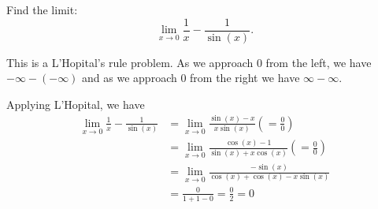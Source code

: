 \documentclass{ximera}
\author{Emma Smith Zbarsky}
\begin{document}
\begin{exercise}

Find the limit: \[\lim_{x \to 0} \frac{1}{x} - \frac{1}{\sin(x)}.\]


\begin{hint}
This is a L'Hopital's rule problem. As we approach 0 from the left, we
have $-\infty - (-\infty)$ and as we approach 0 from the right we have
$\infty-\infty$.
\end{hint}


\begin{hint}
Applying L'Hopital, we have \begin{align*}
\lim_{x\to 0} \frac{1}{x} - \frac{1}{\sin(x)} &= \lim_{x\to 0} \frac{\sin(x)-x}{x\sin(x)} \left(=\frac{0}{0}\right) \\
&= \lim_{x\to 0} \frac{\cos(x)-1}{\sin(x)+x\cos(x)} \left(=\frac{0}{0}\right) \\
&= \lim_{x\to 0} \frac{-\sin(x)}{\cos(x)+\cos(x)-x\sin(x)} \\
&= \frac{0}{1+1-0} = \frac{0}{2} = 0
\end{align*}
\end{hint}


\begin{multipleChoice}
\choice{$-\infty$}
\choice{$\infty$}
\end{multipleChoice}

\end{exercise}
\end{document}

